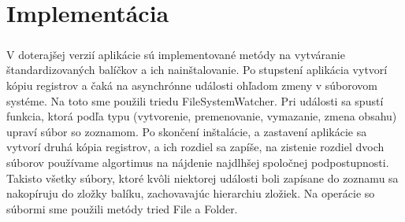 \chapter{Implementácia}

\paragraph{}
V doterajšej verzií aplikácie sú implementované metódy na vytváranie štandardizovaných balíčkov a ich nainštalovanie. Po stupstení aplikácia vytvorí kópiu registrov a čaká na asynchrónne události ohľadom zmeny v súborovom systéme. Na toto sme použili triedu FileSystemWatcher. Pri události sa spustí funkcia, ktorá podľa typu (vytvorenie, premenovanie, vymazanie, zmena obsahu) upraví súbor so zoznamom. Po skončení inštalácie, a zastavení aplikácie sa vytvorí druhá kópia registrov, a ich rozdiel sa zapíše, na zistenie rozdiel dvoch súborov používame algortimus na nájdenie najdlhšej spoločnej podpostupnosti. Takisto všetky súbory, ktoré kvôli niektorej události boli zapísane do zoznamu sa nakopíruju do zložky balíku, zachovavajúc hierarchiu zložiek. Na operácie so súbormi sme použili metódy tried File a Folder.
